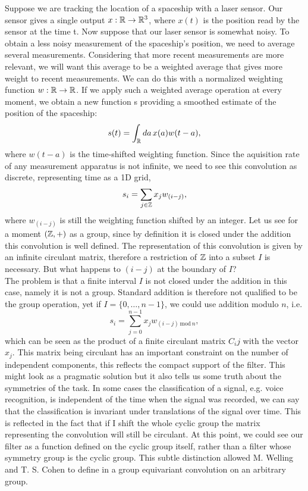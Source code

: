 \documentclass[../3.tex]{subfiles}
\begin{document}
    Suppose we are tracking the location of a spaceship with a laser sensor. Our
    sensor gives a single output $x : \mathbb{R} \to \mathbb{R}^3$, where $x(t)$ is the position read by the sensor at the time t.
    Now suppose that our laser sensor is somewhat noisy. To obtain a less noisy
    measurement of the spaceship’s position, we need to average several measurements.
    Considering that more recent measurements are more relevant, we will want this average to
    be a weighted average that gives more weight to recent measurements. 
    We can do this with a normalized weighting function $w:\mathbb{R} \to \mathbb{R}$. If
    we apply such a weighted average operation at every moment, we obtain a new
    function s providing a smoothed estimate of the position of the spaceship:
    \[ s(t) = \int_{\mathbb{R}} da \, x(a)w(t-a), \]
    where $w(t-a)$ is the time-shifted weighting function.
    Since the aquisition rate of any measurement apparatus is not infinite, we need to see this convolution as discrete, representing time as a 1D grid,
    \[ s_i = \sum_{j \in \mathbb{Z}} x_j w_{(i-j)}, \]
    where $w_{(i-j)}$ is still the weighting function shifted by an integer.
    Let us see for a moment $(\mathbb{Z},+)$ as a group, since by definition it is closed under the addition this convolution is well defined.
    The representation of this convolution is given by an infinite circulant matrix, therefore a restriction of $\mathbb{Z}$
    into a subset $I$ is necessary. But what happens to $(i-j)$ at the boundary of $I$?\\
    The problem is that a finite interval $I$ is not closed under the addition in this case, namely it is not a group.
    Standard addition is therefore not qualified to be the group operation, yet if $I = \{ 0,\dots,n-1 \}$, we could use
    addition modulo $n$, i.e. 
    \[ s_i = \sum_{j = 0}^{n-1} x_j w_{(i-j) \, \text{mod} \, n},\]
    which can be seen as the product of a finite circulant matrix $C_ij$ with the vector $x_j$.
    This matrix being circulant has an important constraint on the number of independent components, this reflects the compact support of the filter.
    This might look as a pragmatic solution but it also tells us some truth about the symmetries of the task.
    In some cases the classification of a signal, e.g. voice recognition, is independent of the time when the signal was recorded,
    we can say that the classification is invariant under translations of the signal over time. This is reflected in the fact that if I 
    shift the whole cyclic group the matrix representing the convolution will still be circulant.
    At this point, we could see our filter as a function defined on the cyclic group itself, rather than a filter whose symmetry group is the cyclic group.
    This subtle distinction allowed M. Welling and T. S. Cohen to define in \cite{gcnn} a group equivariant convolution on an arbitrary group.
    
\end{document}
